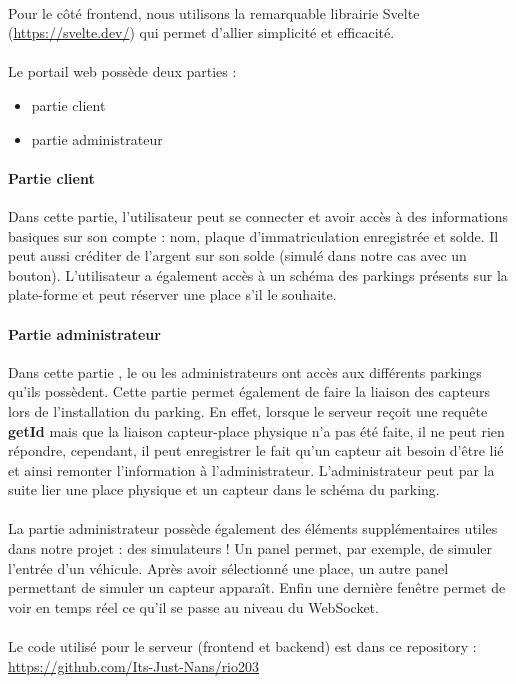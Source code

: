 \paragraph*{}
Pour le côté frontend, nous utilisons la remarquable librairie Svelte (\url{https://svelte.dev/}) qui permet d'allier simplicité et efficacité.

\paragraph*{}
Le portail web possède deux parties :

\begin{itemize}
    \item partie client
    \item partie administrateur
\end{itemize}

\paragraph*{Partie client}
Dans cette partie, l'utilisateur peut se connecter et avoir accès à des informations basiques sur son compte : nom, plaque d'immatriculation enregistrée et solde. Il peut aussi créditer de l'argent sur son solde (simulé dans notre cas avec un bouton).
L'utilisateur a également accès à un schéma des parkings présents sur la plate-forme et peut réserver une place s'il le souhaite.

\paragraph*{Partie administrateur}
Dans cette partie , le ou les administrateurs ont accès aux différents parkings qu'ils possèdent. Cette partie permet également de faire la liaison des capteurs lors de l'installation du parking. En effet, lorsque le serveur reçoit une requête \textbf{getId} mais que la liaison capteur-place physique n'a pas été faite, il ne peut rien répondre, cependant, il peut enregistrer le fait qu'un capteur ait besoin d'être lié et ainsi remonter l'information à l'administrateur.
L'administrateur peut par la suite lier une place physique et un capteur dans le schéma du parking.


\paragraph*{}
La partie administrateur possède également des éléments supplémentaires utiles dans notre projet : des simulateurs ! Un panel permet, par exemple, de simuler l'entrée d'un véhicule. Après avoir sélectionné une place, un autre panel permettant de simuler un capteur apparaît. Enfin une dernière fenêtre permet de voir en temps réel ce qu'il se passe au niveau du WebSocket.


\paragraph*{}
Le code utilisé pour le serveur (frontend et backend) est dans ce repository : \url{https://github.com/Its-Just-Nans/rio203}
